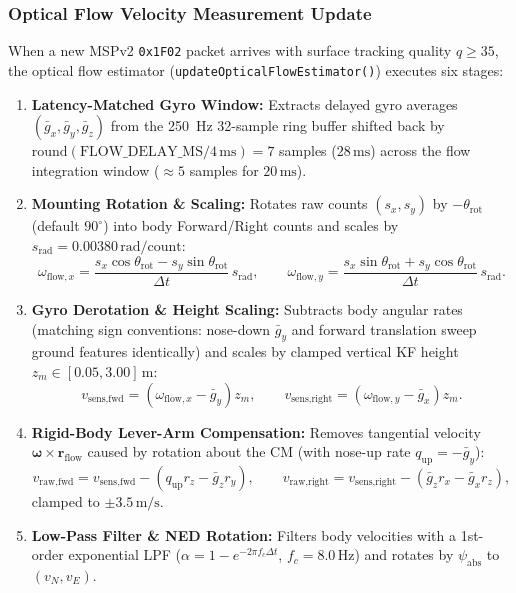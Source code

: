 \documentclass[11pt,a4paper]{article}
\begin{document}
\subsubsection*{Optical Flow Velocity Measurement Update}
When a new MSPv2 \texttt{0x1F02} packet arrives with surface tracking quality $q \ge 35$, the optical flow estimator (\texttt{updateOpticalFlowEstimator()}) executes six stages:
\begin{enumerate}
  \item \textbf{Latency-Matched Gyro Window:} Extracts delayed gyro averages $(\bar{g}_x, \bar{g}_y, \bar{g}_z)$ from the 250~Hz 32-sample ring buffer shifted back by $\text{round}(\text{FLOW\_DELAY\_MS}/4\,\text{ms}) = 7$ samples ($28\,\text{ms}$) across the flow integration window ($\approx 5$ samples for $20\,\text{ms}$).
  \item \textbf{Mounting Rotation \& Scaling:} Rotates raw counts $(s_x, s_y)$ by $-\theta_{\text{rot}}$ (default $90^\circ$) into body Forward/Right counts and scales by $s_{\text{rad}} = 0.00380\,\text{rad/count}$:
  \begin{equation}
    \omega_{\text{flow},x} = \frac{s_x\cos\theta_{\text{rot}} - s_y\sin\theta_{\text{rot}}}{\Delta t}\,s_{\text{rad}}, \qquad
    \omega_{\text{flow},y} = \frac{s_x\sin\theta_{\text{rot}} + s_y\cos\theta_{\text{rot}}}{\Delta t}\,s_{\text{rad}}.
  \end{equation}
  \item \textbf{Gyro Derotation \& Height Scaling:} Subtracts body angular rates (matching sign conventions: nose-down $\bar{g}_y$ and forward translation sweep ground features identically) and scales by clamped vertical KF height $z_m \in [0.05, 3.00]\,\text{m}$:
  \begin{equation}
    v_{\text{sens,fwd}} = (\omega_{\text{flow},x} - \bar{g}_y)z_m, \qquad
    v_{\text{sens,right}} = (\omega_{\text{flow},y} - \bar{g}_x)z_m.
  \end{equation}
  \item \textbf{Rigid-Body Lever-Arm Compensation:} Removes tangential velocity $\boldsymbol{\omega} \times \mathbf{r}_{\text{flow}}$ caused by rotation about the CM (with nose-up rate $q_{\text{up}} = -\bar{g}_y$):
  \begin{equation}
    v_{\text{raw,fwd}}   = v_{\text{sens,fwd}}   - (q_{\text{up}} r_{z} - \bar{g}_z r_{y}), \qquad
    v_{\text{raw,right}} = v_{\text{sens,right}} - (\bar{g}_z r_{x} - \bar{g}_x r_{z}),
  \end{equation}
  clamped to $\pm 3.5\,\text{m/s}$.
  \item \textbf{Low-Pass Filter \& NED Rotation:} Filters body velocities with a 1st-order exponential LPF ($\alpha = 1 - e^{-2\pi f_c \Delta t}$, $f_c = 8.0\,\text{Hz}$) and rotates by $\psi_{\text{abs}}$ to $(v_N, v_E)$.

\end{enumerate}
\end{document}
